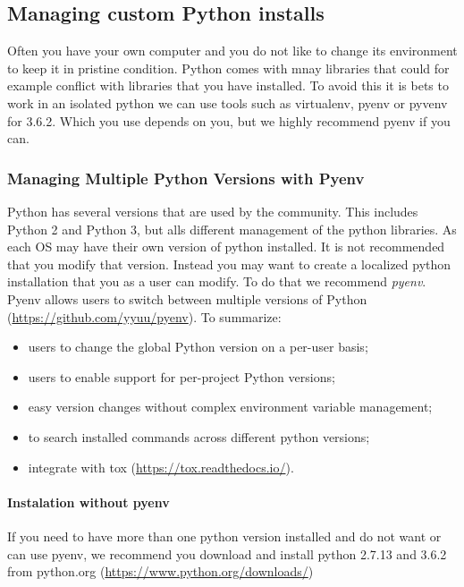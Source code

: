 \subsection{Managing custom Python
installs}\label{managing-custom-python-installs}

Often you have your own computer and you do not like to change its
environment to keep it in pristine condition. Python comes with mnay
libraries that could for example conflict with libraries that you have
installed. To avoid this it is bets to work in an isolated python we can
use tools such as virtualenv, pyenv or pyvenv for 3.6.2. Which you use
depends on you, but we highly recommend pyenv if you can.

\subsubsection{Managing Multiple Python Versions with
Pyenv}\label{managing-multiple-python-versions-with-pyenv}

Python has several versions that are used by the community. This
includes Python 2 and Python 3, but alls different management of the
python libraries. As each OS may have their own version of python
installed. It is not recommended that you modify that version. Instead
you may want to create a localized python installation that you as a
user can modify. To do that we recommend \emph{pyenv}. Pyenv allows
users to switch between multiple versions of Python
(\url{https://github.com/yyuu/pyenv}). To summarize:

\begin{itemize}
\tightlist
\item
  users to change the global Python version on a per-user basis;
\item
  users to enable support for per-project Python versions;
\item
  easy version changes without complex environment variable management;
\item
  to search installed commands across different python versions;
\item
  integrate with tox (\url{https://tox.readthedocs.io/}).
\end{itemize}

\paragraph{Instalation without pyenv}\label{instalation-without-pyenv}

If you need to have more than one python version installed and do not
want or can use pyenv, we recommend you download and install python
2.7.13 and 3.6.2 from python.org
(\url{https://www.python.org/downloads/})

